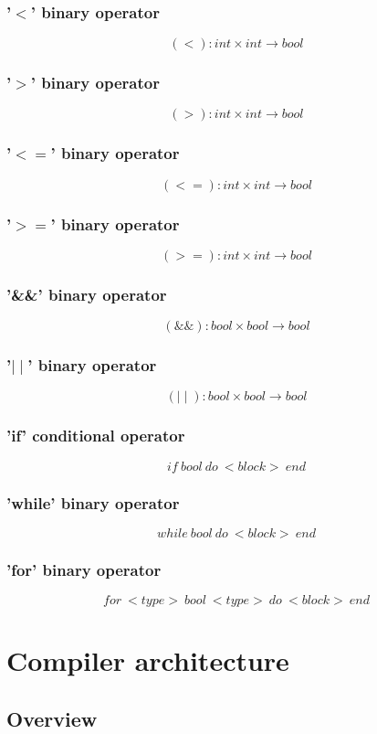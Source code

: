 \documentclass{article}
\begin{document}
\subsubsection{'$<$' binary operator}
$$
(<): int \times int \longrightarrow bool
$$

\subsubsection{'$>$' binary operator}
$$
(>): int \times int \longrightarrow bool
$$
\subsubsection{'$<=$' binary operator}
$$
(<=): int \times int \longrightarrow bool
$$
\subsubsection{'$>=$' binary operator}
$$
(>=): int \times int \longrightarrow bool
$$
\subsubsection{'\&\&' binary operator}
$$
(\&\&): bool \times bool \longrightarrow bool
$$
\subsubsection{'$\mid\mid$' binary operator}
$$
(\mid\mid): bool \times bool \longrightarrow bool
$$
\subsubsection{'if' conditional operator}
$$
if \ bool \ do \ <block> \ end
$$
\subsubsection{'while' binary operator}
$$
while \ bool \ do \ <block> \ end
$$
\subsubsection{'for' binary operator}
$$
for \ <type> \ bool \ <type> \ do \ <block> \ end
$$

\section{Compiler architecture}
\subsection{Overview}
\end{document}
